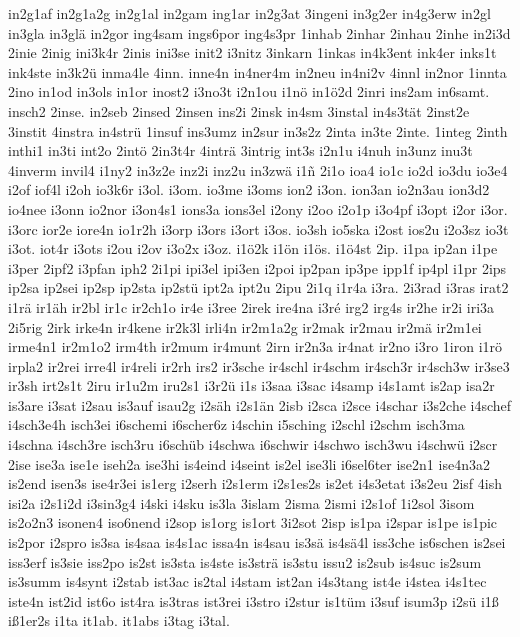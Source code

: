 {in2g1af
in2g1a2g
in2g1al
in2gam
ing1ar
in2g3at
3ingeni
in3g2er
in4g3erw
in2gl
in3gla
in3glä
in2gor
ing4sam
ings6por
ing4s3pr
1inhab
2inhar
2inhau
2inhe
in2i3d
2inie
2inig
ini3k4r
2inis
ini3se
init2
i3nitz
3inkarn
1inkas
in4k3ent
ink4er
inks1t
ink4ste
in3k2ü
inma4le
4inn.
inne4n
in4ner4m
in2neu
in4ni2v
4innl
in2nor
1innta
2ino
in1od
in3ols
in1or
inost2
i3no3t
i2n1ou
i1nö
in1ö2d
2inri
ins2am
in6samt.
insch2
2inse.
in2seb
2insed
2insen
ins2i
2insk
in4sm
3instal
in4s3tät
2inst2e
3instit
4instra
in4strü
1insuf
ins3umz
in2sur
in3s2z
2inta
in3te
2inte.
1integ
2inth
inthi1
in3ti
int2o
2intö
2in3t4r
4inträ
3intrig
int3s
i2n1u
i4nuh
in3unz
inu3t
4inverm
invil4
i1ny2
in3z2e
inz2i
inz2u
in3zwä
i1ñ
2i1o
ioa4
io1c
io2d
io3du
io3e4
i2of
iof4l
i2oh
io3k6r
i3ol.
i3om.
io3me
i3oms
ion2
i3on.
ion3an
io2n3au
ion3d2
io4nee
i3onn
io2nor
i3on4s1
ions3a
ions3el
i2ony
i2oo
i2o1p
i3o4pf
i3opt
i2or
i3or.
i3orc
ior2e
iore4n
io1r2h
i3orp
i3ors
i3ort
i3os.
io3sh
io5ska
i2ost
ios2u
i2o3sz
io3t
i3ot.
iot4r
i3ots
i2ou
i2ov
i3o2x
i3oz.
i1ö2k
i1ön
i1ös.
i1ö4st
2ip.
i1pa
ip2an
i1pe
i3per
2ipf2
i3pfan
iph2
2i1pi
ipi3el
ipi3en
i2poi
ip2pan
ip3pe
ipp1f
ip4pl
i1pr
2ips
ip2sa
ip2sei
ip2sp
ip2sta
ip2stü
ipt2a
ipt2u
2ipu
2i1q
i1r4a
i3ra.
2i3rad
i3ras
irat2
i1rä
ir1äh
ir2bl
ir1c
ir2ch1o
ir4e
i3ree
2irek
ire4na
i3ré
irg2
irg4s
ir2he
ir2i
iri3a
2i5rig
2irk
irke4n
ir4kene
ir2k3l
irli4n
ir2m1a2g
ir2mak
ir2mau
ir2mä
ir2m1ei
irme4n1
ir2m1o2
irm4th
ir2mum
ir4munt
2irn
ir2n3a
ir4nat
ir2no
i3ro
1iron
i1rö
irpla2
ir2rei
irre4l
ir4reli
ir2rh
irs2
ir3sche
ir4schl
ir4schm
ir4sch3r
ir4sch3w
ir3se3
ir3sh
irt2s1t
2iru
ir1u2m
iru2s1
i3r2ü
i1s
i3saa
i3sac
i4samp
i4s1amt
is2ap
isa2r
is3are
i3sat
i2sau
is3auf
isau2g
i2säh
i2s1än
2isb
i2sca
i2sce
i4schar
i3s2che
i4schef
i4sch3e4h
isch3ei
i6schemi
i6scher6z
i4schin
i5sching
i2schl
i2schm
isch3ma
i4schna
i4sch3re
isch3ru
i6schüb
i4schwa
i6schwir
i4schwo
isch3wu
i4schwü
i2scr
2ise
ise3a
ise1e
iseh2a
ise3hi
is4eind
i4seint
is2el
ise3li
i6sel6ter
ise2n1
ise4n3a2
is2end
isen3s
ise4r3ei
is1erg
i2serh
i2s1erm
i2s1es2s
is2et
i4s3etat
i3s2eu
2isf
4ish
isi2a
i2s1i2d
i3sin3g4
i4ski
i4sku
is3la
3islam
2isma
2ismi
i2s1of
1i2sol
3isom
is2o2n3
isonen4
iso6nend
i2sop
is1org
is1ort
3i2sot
2isp
is1pa
i2spar
is1pe
is1pic
is2por
i2spro
is3sa
is4saa
is4s1ac
issa4n
is4sau
is3sä
is4sä4l
iss3che
is6schen
is2sei
iss3erf
is3sie
iss2po
is2st
is3sta
is4ste
is3strä
is3stu
issu2
is2sub
is4suc
is2sum
is3summ
is4synt
i2stab
ist3ac
is2tal
i4stam
ist2an
i4s3tang
ist4e
i4stea
i4s1tec
iste4n
ist2id
ist6o
ist4ra
is3tras
ist3rei
i3stro
i2stur
is1tüm
i3suf
isum3p
i2sü
i1ß
iß1er2s
i1ta
it1ab.
it1abs
i3tag
i3tal.
}
